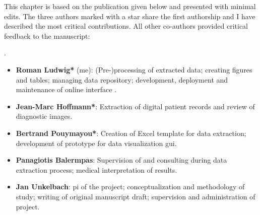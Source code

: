 \begin{tcolorbox}[
    title=\faIcon{users} Contributions,
    parbox=false,
    float
]
    This chapter is based on the publication given below and presented with minimal edits. The three authors marked with a star share the first authorship and I have described the most critical contributions. All other co-authors provided critical feedback to the manuscript:
    
    .

    \begin{itemize}[leftmargin=5.5mm]
        \item[\faIcon{user}] \textbf{Roman Ludwig*} (me): (Pre-)processing of extracted data; creating figures and tables; managing data repository; development, deployment and maintenance of online interface .
        \item[\faIcon{user}] \textbf{Jean-Marc Hoffmann*}: Extraction of digital patient records and review of diagnostic images.
        \item[\faIcon{user}] \textbf{Bertrand Pouymayou*}: Creation of Excel template for data extraction; development of prototype for data visualization \acrshort{gui}.
        \item[\faIcon{user}] \textbf{Panagiotis Balermpas}: Supervision of and consulting during data extraction process; medical interpretation of results.
        \item[\faIcon{user}] \textbf{Jan Unkelbach}: \Gls{pi} of the project; conceptualization and methodology of study; writing of original manuscript draft; supervision and administration of project.
    \end{itemize}
\end{tcolorbox}

